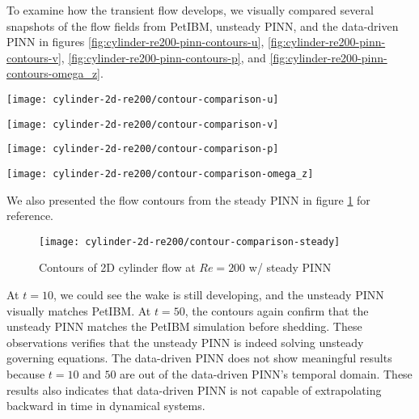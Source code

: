 To examine how the transient flow develops, we visually compared several snapshots of the flow fields from PetIBM, unsteady PINN, and the data-driven PINN in figures \ref{fig:cylinder-re200-pinn-contours-u}, \ref{fig:cylinder-re200-pinn-contours-v}, \ref{fig:cylinder-re200-pinn-contours-p}, and \ref{fig:cylinder-re200-pinn-contours-omega_z}.
\begin{figure*}
    \centering%
    \texttt{[image: cylinder-2d-re200/contour-comparison-u]}%
    \caption{%
        $u$-velocity comparison of 2D cylinder flow of $Re=\num{200}$ between PetIBM, unsteady PINN, and data-driven PINN.
    }
    \label{fig:cylinder-re200-pinn-contours-u}%
\end{figure*}
\begin{figure*}
    \centering%
    \texttt{[image: cylinder-2d-re200/contour-comparison-v]}%
    \caption{%
        $v$-velocity comparison of 2D cylinder flow of $Re=\num{200}$ between PetIBM, unsteady PINN, and data-driven PINN.
    }
    \label{fig:cylinder-re200-pinn-contours-v}%
\end{figure*}
\begin{figure*}
    \centering%
    \texttt{[image: cylinder-2d-re200/contour-comparison-p]}%
    \caption{%
        Pressure comparison of 2D cylinder flow of $Re=\num{200}$ between PetIBM, unsteady PINN, and data-driven PINN.
    }
    \label{fig:cylinder-re200-pinn-contours-p}%
\end{figure*}
\begin{figure*}
    \centering%
    \texttt{[image: cylinder-2d-re200/contour-comparison-omega\_z]}%
    \caption{%
        Vorticity ($\omega_z$) comparison of 2D cylinder flow of $Re=\num{200}$ between PetIBM, unsteady PINN, and data-driven PINN.
    }
    \label{fig:cylinder-re200-pinn-contours-omega_z}%
\end{figure*}
We also presented the flow contours from the steady PINN in figure \ref{fig:cylinder-re200-steady-pinn-contours} for reference.
\begin{figure}
    \centering%
    \texttt{[image: cylinder-2d-re200/contour-comparison-steady]}%
    \caption{%
        Contours of 2D cylinder flow at $Re=\num{200}$ w/ steady PINN
    }
    \label{fig:cylinder-re200-steady-pinn-contours}%
\end{figure}

At $t=10$, we could see the wake is still developing, and the unsteady PINN visually matches PetIBM.
At $t=50$, the contours again confirm that the unsteady PINN matches the PetIBM simulation before shedding.
These observations verifies that the unsteady PINN is indeed solving unsteady governing equations.
The data-driven PINN does not show meaningful results because $t=10$ and $50$ are out of the data-driven PINN's temporal domain.
These results also indicates that data-driven PINN is not capable of extrapolating backward in time in dynamical systems.

